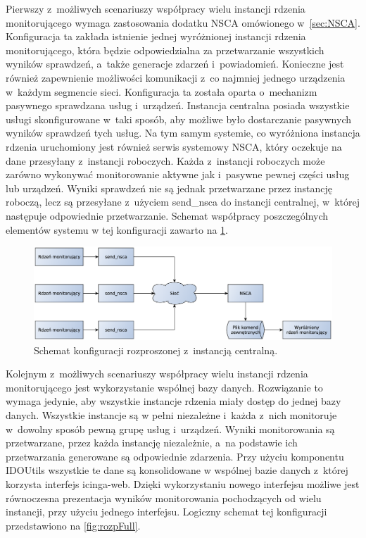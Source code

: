 Pierwszy z~możliwych scenariuszy współpracy wielu instancji rdzenia
monitorującego wymaga zastosowania dodatku NSCA omówionego
w~\ref{sec:NSCA}. Konfiguracja ta zakłada istnienie jednej wyróżnionej
instancji rdzenia monitorującego, która będzie odpowiedzialna za
przetwarzanie wszystkich wyników sprawdzeń, a~także generacje zdarzeń
i~powiadomień. Konieczne jest również zapewnienie możliwości
komunikacji z~co najmniej jednego urządzenia w~każdym segmencie
sieci. Konfiguracja ta została oparta o~mechanizm pasywnego sprawdzana
usług i~urządzeń. Instancja centralna posiada wszystkie usługi
skonfigurowane w~taki sposób, aby możliwe było dostarczanie pasywnych
wyników sprawdzeń tych usług. Na tym samym systemie, co wyróżniona
instancja rdzenia uruchomiony jest również serwis systemowy NSCA,
który oczekuje na dane przesyłany z~instancji roboczych. Każda
z~instancji roboczych może zarówno wykonywać monitorowanie aktywne jak
i~pasywne pewnej części usług lub urządzeń. Wyniki sprawdzeń nie są
jednak przetwarzane przez instancję roboczą, lecz są przesyłane
z~użyciem send\_nsca do instancji centralnej, w~której następuje
odpowiednie przetwarzanie. Schemat współpracy poszczególnych elementów
systemu w tej konfiguracji zawarto na \ref{fig:rozpNSCA}.

\begin{figure}[ht]
  \caption{Schemat konfiguracji rozproszonej z~instancją centralną.}
  \label{fig:rozpNSCA}
\includegraphics[width=1\textwidth]{img/icingaNSCA}
\end{figure}

Kolejnym z~możliwych scenariuszy współpracy wielu instancji rdzenia
monitorującego jest wykorzystanie wspólnej bazy danych. Rozwiązanie to
wymaga jedynie, aby wszystkie instancje rdzenia miały dostęp do jednej
bazy danych. Wszystkie instancje są w pełni niezależne i~każda z~nich
monitoruje w~dowolny sposób pewną grupę usług i~urządzeń. Wyniki
monitorowania są przetwarzane, przez każda instancję niezależnie, a~na
podstawie ich przetwarzania generowane są odpowiednie zdarzenia. Przy
użyciu komponentu IDOUtils wszystkie te dane są konsolidowane w
wspólnej bazie danych z~której korzysta interfejs icinga-web. Dzięki
wykorzystaniu nowego interfejsu możliwe jest równoczesna prezentacja
wyników monitorowania pochodzących od wielu instancji, przy użyciu
jednego interfejsu. Logiczny schemat tej konfiguracji przedstawiono na
\ref{fig:rozpFull}.

